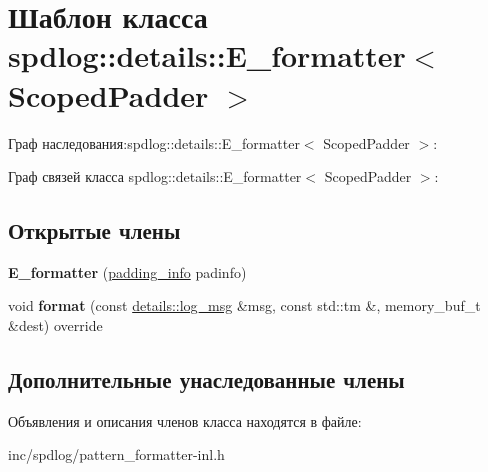 \hypertarget{classspdlog_1_1details_1_1E__formatter}{}\section{Шаблон класса spdlog\+:\+:details\+:\+:E\+\_\+formatter$<$ Scoped\+Padder $>$}
\label{classspdlog_1_1details_1_1E__formatter}


Граф наследования\+:spdlog\+:\+:details\+:\+:E\+\_\+formatter$<$ Scoped\+Padder $>$\+:


Граф связей класса spdlog\+:\+:details\+:\+:E\+\_\+formatter$<$ Scoped\+Padder $>$\+:
\subsection*{Открытые члены}
\begin{DoxyCompactItemize}
\item 
\mbox{\label{classspdlog_1_1details_1_1E__formatter_a5f8fc59bdb707c106afc66e2bea7fdda}} 
{\bfseries E\+\_\+formatter} (\hyperlink{structspdlog_1_1details_1_1padding__info}{padding\+\_\+info} padinfo)
\item 
\mbox{\label{classspdlog_1_1details_1_1E__formatter_a7e31fd13e64f3fcfb0b4ed4ff6c157b1}} 
void {\bfseries format} (const \hyperlink{structspdlog_1_1details_1_1log__msg}{details\+::log\+\_\+msg} \&msg, const std\+::tm \&, memory\+\_\+buf\+\_\+t \&dest) override
\end{DoxyCompactItemize}
\subsection*{Дополнительные унаследованные члены}


Объявления и описания членов класса находятся в файле\+:\begin{DoxyCompactItemize}
\item 
inc/spdlog/pattern\+\_\+formatter-\/inl.\+h\end{DoxyCompactItemize}
